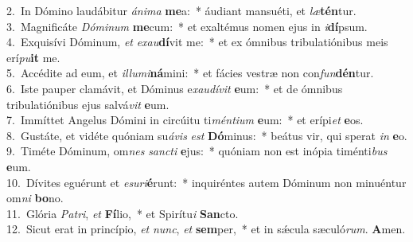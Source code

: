 {2.~}In Dómino laudábitur \textit{á}\textit{ni}\textit{ma} \textbf{me}a:~* áudiant mansuéti, et \textit{læ}\textbf{tén}tur.\\
{3.~}Magnificáte \textit{Dó}\textit{mi}\textit{num} \textbf{me}cum:~* et exaltémus nomen ejus in \textit{i}\textbf{dí}psum.\\
{4.~}Exquisívi Dóminum, \textit{et} \textit{e}\textit{xau}\textbf{dí}vit me:~* et ex ómnibus tribulatiónibus meis erí\textit{pu}\textbf{it} me.\\
{5.~}Accédite ad eum, et \textit{il}\textit{lu}\textit{mi}\textbf{ná}mini:~* et fácies vestræ non con\textit{fun}\textbf{dén}tur.\\
{6.~}Iste pauper clamávit, et Dóminus e\textit{xau}\textit{dí}\textit{vit} \textbf{e}um:~* et de ómnibus tribulatiónibus ejus salvá\textit{vit} \textbf{e}um.\\
{7.~}Immíttet Angelus Dómini in circúitu ti\textit{mén}\textit{ti}\textit{um} \textbf{e}um:~* et erípi\textit{et} \textbf{e}os.\\
{8.~}Gustáte, et vidéte quóniam su\textit{á}\textit{vis} \textit{est} \textbf{Dó}minus:~* beátus vir, qui sperat \textit{in} \textbf{e}o.\\
{9.~}Timéte Dóminum, om\textit{nes} \textit{san}\textit{cti} \textbf{e}jus:~* quóniam non est inópia timénti\textit{bus} \textbf{e}um.\\
{10.~}Dívites eguérunt et \textit{e}\textit{su}\textit{ri}\textbf{é}runt:~* inquiréntes autem Dóminum non minuéntur om\textit{ni} \textbf{bo}no.\\
{11.~}Glória \textit{Pa}\textit{tri}, \textit{et} \textbf{Fí}lio,~* et Spirítu\textit{i} \textbf{San}cto.\\
{12.~}Sicut erat in princípio, \textit{et} \textit{nunc}, \textit{et} \textbf{sem}per,~* et in sǽcula sæculó\textit{rum}. \textbf{A}men.\\
